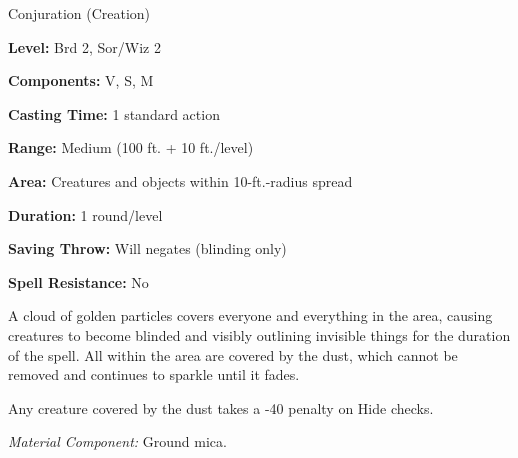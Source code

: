 
Conjuration (Creation)

\textbf{Level:} Brd 2, Sor/Wiz 2

\textbf{Components:} V, S, M

\textbf{Casting Time:} 1 standard action

\textbf{Range:} Medium (100 ft. + 10 ft./level)

\textbf{Area:} Creatures and objects within 10-ft.-radius spread

\textbf{Duration:} 1 round/level

\textbf{Saving Throw:} Will negates (blinding only)

\textbf{Spell Resistance:} No

A cloud of golden particles covers everyone and everything in the area, causing 
creatures to become blinded and visibly outlining invisible things for the duration 
of the spell. All within the area are covered by the dust, which cannot be removed 
and continues to sparkle until it fades.

Any creature covered by the dust takes a -40 penalty on Hide checks.

\textit{Material Component:} Ground mica.

